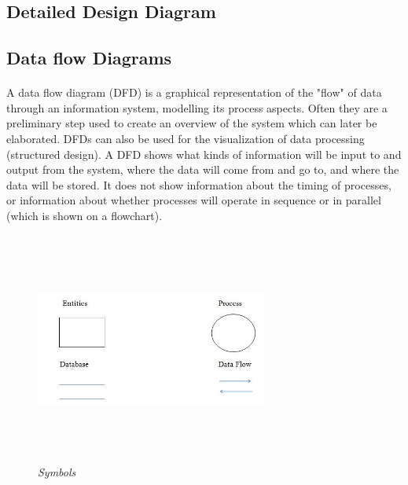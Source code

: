 \begin{center}
\section{Detailed Design Diagram}
\end{center}

\subsection{Data flow Diagrams}
\paragraph{}
A data flow diagram (DFD) is a graphical representation of the "flow" of data through an information system, modelling its process aspects. Often they are a preliminary step used to create an overview of the system which can later be elaborated. DFDs can also be used for the visualization of data processing (structured design).
A DFD shows what kinds of information will be input to and output from the system, where the data will come from and go to, and where the data will be stored. It does not show information about the timing of processes, or information about whether processes will operate in sequence or in parallel (which is shown on a flowchart).
\begin{figure}[h]
\centering
\includegraphics[height=3in, width = 3in]{sym.jpg}
\caption{\emph{Symbols}}
\label{fig:1}
\end{figure}



